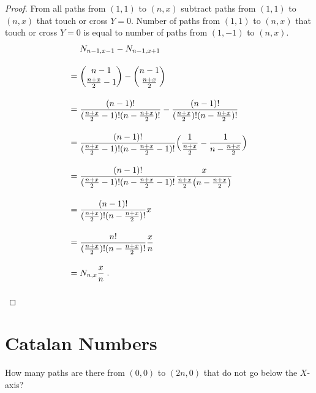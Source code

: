 \begin{proof}
From all paths from $(1,1)$ to $(n,x)$ 
subtract paths from $(1,1)$ to $(n,x)$
that touch or cross $Y=0$. Number of paths
from $(1,1)$ to $(n,x)$ that touch or cross $Y=0$ is equal to number of paths from $(1,-1)$ to $(n,x)$.
\begin{align*}
& N_{n-1,x-1}-N_{n-1,x+1} \\[1em]
={} & \binom{n-1}{\frac{n+x}{2}-1}
- \binom{n-1}{\frac{n+x}{2}} \\[1em]
={} & \frac{(n-1)!}{(\frac{n+x}{2}-1)!(n-\frac{n+x}{2})!}
- \frac{(n-1)!}{(\frac{n+x}{2})!(n-\frac{n+x}{2})!}\\[1em]
={} & \frac{(n-1)!}{(\frac{n+x}{2}-1)!(n-\frac{n+x}{2}-1)!}
\Bigl(\frac{1}{\frac{n+x}{2}}
-\frac{1}{n-\frac{n+x}{2}}\Bigr)\\[1em]
={} & \frac{(n-1)!}{(\frac{n+x}{2}-1)!(n-\frac{n+x}{2}-1)!}
\frac{x}{\frac{n+x}{2}\bigl(n-\frac{n+x}{2}\bigr)}\\[1em]
={} & \frac{(n-1)!}{(\frac{n+x}{2})!(n-\frac{n+x}{2})!}
x\\[1em]
={} & \frac{n!}{(\frac{n+x}{2})!(n-\frac{n+x}{2})!}
\frac{x}{n}\\[1em]
={} & N_{n,x}\frac{x}{n}\;.\\[1em]
\end{align*}
\end{proof}

\section{Catalan Numbers}

How many paths are there from $(0,0)$ to $(2n,0)$ that do not go below the $X$-axis? 

